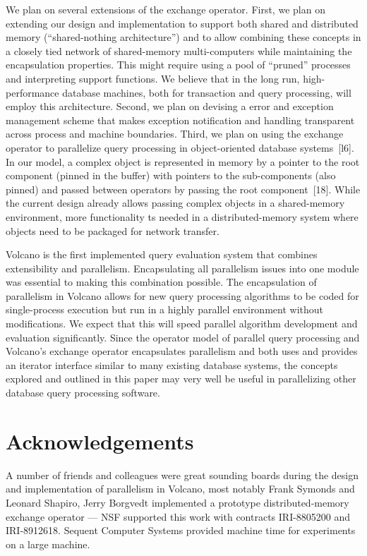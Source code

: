 \documentclass[a4paper,11pt,notitlepage,twoside,openright]{article}
\begin{document}
We plan on several extensions of the exchange operator.
First, we plan on extending our design and implementation
to support both shared and distributed memory
(``shared-nothing architecture'') and to allow combining these
concepts in a closely tied network of shared-memory multi-computers
while maintaining the encapsulation properties.
This might require using a pool of ``pruned'' processes and
interpreting support functions. We believe that in the long
run, high-performance database machines, both for transaction
and query processing, will employ this architecture.
Second, we plan on devising a error and exception management
scheme that makes exception notification and handling
transparent across process and machine boundaries. Third,
we plan on using the exchange operator to parallelize query
processing in object-oriented database systems~{[l6]}. In our
model, a complex object is represented in memory by a
pointer to the root component (pinned in the buffer) with
pointers to the sub-components (also pinned) and passed
between operators by passing the root component~{[18]}.
While the current design already allows passing complex
objects in a shared-memory environment, more functionality
ts needed in a distributed-memory system where objects
need to be packaged for network transfer.

Volcano is the first implemented query evaluation
system that combines extensibility and parallelism. Encapsulating
all parallelism issues into one module was essential
to making this combination possible. The encapsulation of
parallelism in Volcano allows for new query processing
algorithms to be coded for single-process execution but run
in a highly parallel environment without modifications. We
expect that this will speed parallel algorithm development
and evaluation significantly. Since the operator model of
parallel query processing and Volcano's exchange operator
encapsulates parallelism and both uses and provides an iterator
interface similar to many existing database systems, the
concepts explored and outlined in this paper may very well
be useful in parallelizing other database query processing
software.

\section*{Acknowledgements}

A number of friends and colleagues were great
sounding boards during the design and implementation of
parallelism in Volcano, most notably Frank Symonds and
Leonard Shapiro, Jerry Borgvedt implemented a prototype
distributed-memory exchange operator --- NSF supported
this work with contracts IRI-8805200 and IRI-8912618.
Sequent Computer Systems provided machine time for
experiments on a large machine.
\end{document}
